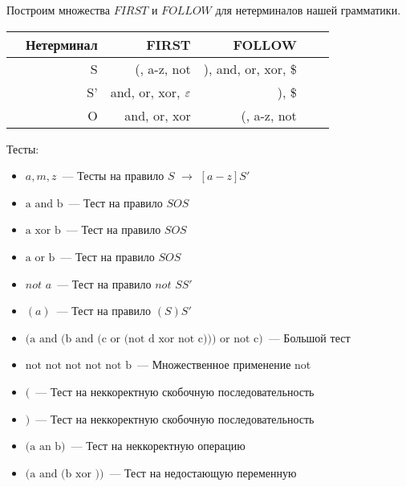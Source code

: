 \documentclass[11pt,a4paper,oneside]{article}
\begin{document}
Построим множества $FIRST$ и $FOLLOW$ для нетерминалов нашей грамматики.

\begin{tabular}{|c||r|r|rrr||}
\hline
 & Нетерминал & FIRST & FOLLOW \\
\hline
\hline
 & S & (, a-z, not & ), and, or, xor, \$ \\
 & S' & and, or, xor, $\varepsilon$ & ), \$ \\
 & O & and, or, xor & (, a-z, not \\
\hline
\end{tabular}
\newline

Тесты:

\begin{itemize}
 \item $a, m, z$~--- Тесты на правило $S$ $\rightarrow$ $[a-z]S'$
 \item $\mbox{a and b}$~--- Тест на правило $SOS$
 \item $\mbox{a xor b}$~--- Тест на правило $SOS$
 \item $\mbox{a or b}$~--- Тест на правило $SOS$
 \item $not$ $a$~--- Тест на правило $not$ $SS'$
 \item $(a)$~--- Тест на правило $(S)S'$
 \item $\mbox{(a and (b and (c or (not d xor not c))) or not c)}$~--- Большой тест
 \item $\mbox{not not not not not b}$~--- Множественное применение not
 \item $($~--- Тест на неккоректную скобочную последовательность
 \item $)$~--- Тест на неккоректную скобочную последовательность
 \item $\mbox{(a an b)}$~--- Тест на неккоректную операцию
 \item $\mbox{(a and (b xor ))}$~--- Тест на недостающую переменную
\end{itemize}
\end{document}
